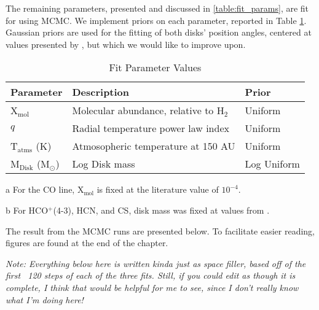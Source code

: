 The remaining parameters, presented and discussed in \ref{table:fit_params}, are fit for using MCMC. We implement priors on each parameter, reported in Table \ref{table:fit_priors}. Gaussian priors are used for the fitting of both disks' position angles, centered at values presented by \cite{Williams2014}, but which we would like to improve upon.

\begin{table}
  \begin{threeparttable}
    \centering
    \caption{Fit Parameter Values}
    \label{table:fit_priors}
    \renewcommand{\arraystretch}{1.2}
    \begin{tabular}{l  l l }
      \toprule \toprule
      Parameter             &  Description                                     & Prior   \\
      \midrule %
      X$_\text{mol}$        &  Molecular abundance, relative to H$_2$\tnote{b} & Uniform \\
      $q$                   &  Radial temperature power law index              & Uniform \\
      T$_\text{atms}$ (K)   & Atmosopheric temperature at 150 AU               & Uniform \\
      M$_\text{Disk}$ (M$_\odot$) &  Log Disk mass\tnote{c}                    & Log Uniform \\
      \bottomrule
    \end{tabular}

    \begin{tablenotes}\footnotesize
      \item[a] For the CO line, X$_\text{mol}$ is fixed at the literature value of $10^{-4}$.
      \item[b] For HCO$^+$(4-3), HCN, and CS, disk mass was fixed at values from \cite{Williams2014}.
    \end{tablenotes}
  \end{threeparttable}
\end{table}


The result from the MCMC runs are presented below. To facilitate easier reading, figures are found at the end of the chapter.

\textit{Note: Everything below here is written kinda just as space filler, based off of the first ~120 steps of each of the three fits. Still, if you could edit as though it is complete, I think that would be helpful for me to see, since I don't really know what I'm doing here!}



